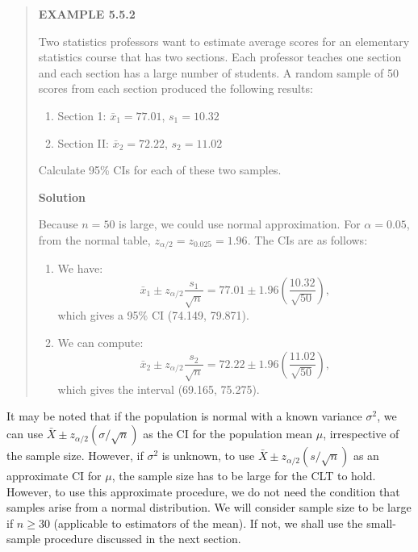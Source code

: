 \begin{quote}
\textbf{EXAMPLE 5.5.2}

Two statistics professors want to estimate average scores for an elementary statistics course that has two sections. Each professor teaches one section and each section has a large number of students. A random sample of 50 scores from each section produced the following results:
\begin{enumerate}
\item[(a)] Section 1: $\bar{x}_1 = 77.01$, $s_1 = 10.32$
\item[(b)] Section II: $\bar{x}_2 = 72.22$, $s_2 = 11.02$
\end{enumerate}
Calculate 95\% CIs for each of these two samples.

\textbf{Solution}

Because $n = 50$ is large, we could use normal approximation. For $\alpha = 0.05$, from the normal table, $z_{\alpha/2} = z_{0.025} = 1.96$. The CIs are as follows:
\begin{enumerate}
\item[(a)] We have:
\[
\bar{x}_1 \pm z_{\alpha/2}\frac{s_1}{\sqrt{n}} = 77.01 \pm 1.96\left(\frac{10.32}{\sqrt{50}}\right),
\]
which gives a 95\% CI (74.149, 79.871).
\item[(b)] We can compute:
\[
\bar{x}_2 \pm z_{\alpha/2}\frac{s_2}{\sqrt{n}} = 72.22 \pm 1.96\left(\frac{11.02}{\sqrt{50}}\right),
\]
which gives the interval (69.165, 75.275).
\end{enumerate}
\end{quote}

It may be noted that if the population is normal with a known variance $\sigma^2$, we can use $\bar{X} \pm z_{\alpha/2}(\sigma/\sqrt{n})$ as the CI for the population mean $\mu$, irrespective of the sample size. However, if $\sigma^2$ is unknown, to use $\bar{X} \pm z_{\alpha/2}(s/\sqrt{n})$ as an approximate CI for $\mu$, the sample size has to be large for the CLT to hold. However, to use this approximate procedure, we do not need the condition that samples arise from a normal distribution. We will consider sample size to be large if $n \geq 30$ (applicable to estimators of the mean). If not, we shall use the small-sample procedure discussed in the next section.
